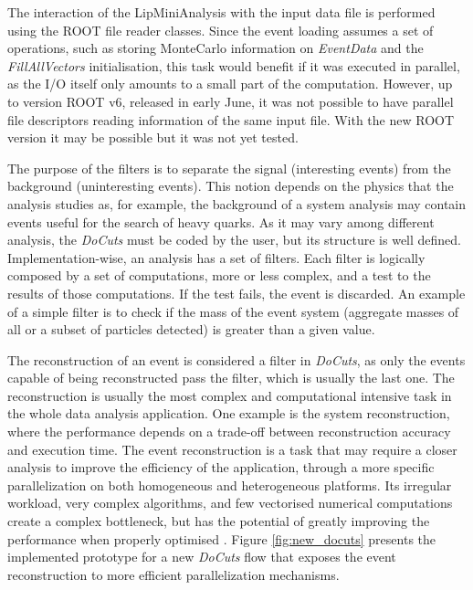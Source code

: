 The interaction of the LipMiniAnalysis with the input data file is performed using the ROOT file reader classes. Since the event loading assumes a set of operations, such as storing MonteCarlo information on \textit{EventData} and the \textit{FillAllVectors} initialisation, this task would benefit if it was executed in parallel, as the I/O itself only amounts to a small part of the computation. However, up to version ROOT v6, released in early June, it was not possible to have parallel file descriptors reading information of the same input file. With the new ROOT version it may be possible but it was not yet tested.

The purpose of the filters is to separate the signal (interesting events) from the background (uninteresting events). This notion depends on the physics that the analysis studies as, for example, the background of a \ttH system analysis may contain events useful for the search of heavy quarks. As it may vary among different analysis, the \textit{DoCuts} must be coded by the user, but its structure is well defined. Implementation-wise, an analysis has a set of filters. Each filter is logically composed by a set of computations, more or less complex, and a test to the results of those computations. If the test fails, the event is discarded. An example of a simple filter is to check if the mass of the event system (aggregate masses of all or a subset of particles detected) is greater than a given value.

The reconstruction of an event is considered a filter in \textit{DoCuts}, as only the events capable of being reconstructed pass the filter, which is usually the last one. The reconstruction is usually the most complex and computational intensive task in the whole data analysis application. One example is the \ttH system reconstruction, where the performance depends on a trade-off between reconstruction accuracy and execution time. The event reconstruction is a task that may require a closer analysis to improve the efficiency of the application, through a more specific parallelization on both homogeneous and heterogeneous platforms. Its irregular workload, very complex algorithms, and few vectorised numerical computations create a complex bottleneck, but has the potential of greatly improving the performance when properly optimised \cite{paperAMP}. Figure \ref{fig:new_docuts} presents the implemented prototype for a new \textit{DoCuts} flow that exposes the event reconstruction to more efficient parallelization mechanisms.

